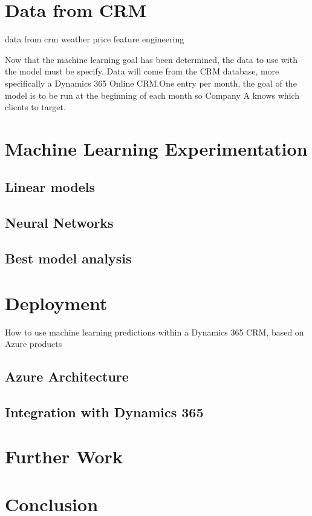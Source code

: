 \section{Data from CRM} \label{sec:crm-data}

data from crm
weather
price
feature engineering

Now that the machine learning goal has been determined, the data to use with the model must be specify. Data will come from the CRM database, more specifically a Dynamics 365 Online CRM.One entry per month, the goal of the model is to be run at the beginning of each month so Company A knows which clients to target.


\section{Machine Learning Experimentation} \label{sec:ml-experimentation}
\lipsum[1]

\subsection{Linear models}
\lipsum[2]

\subsection{Neural Networks}
\lipsum[3]

\subsection{Best model analysis}
\lipsum[3]


\section{Deployment} \label{sec:crm-deployment}
How to use machine learning predictions within a Dynamics 365 CRM, based on Azure products

\subsection{Azure Architecture}
\lipsum[2]

\subsection{Integration with Dynamics 365}
\lipsum[3]


\section{Further Work} \label{sec:use-case-further-work}
\lipsum[1]

\section{Conclusion} \label{sec:use-case-conclusion}
\lipsum[1]